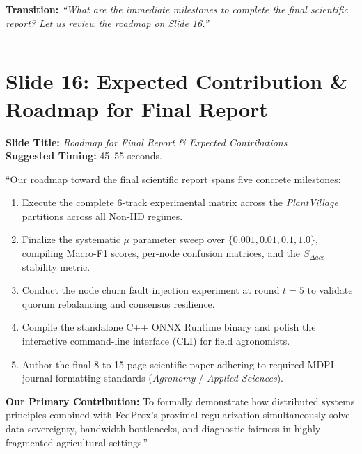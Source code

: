 \documentclass[11pt,a4paper]{article}
\begin{document}
\textbf{Transition:} \textit{``What are the immediate milestones to complete the final scientific report? Let us review the roadmap on Slide 16.''}

\vspace{0.35cm}\hrule\vspace{0.35cm}

\section{Slide 16: Expected Contribution \& Roadmap for Final Report}
\textbf{Slide Title:} \textit{Roadmap for Final Report \& Expected Contributions} \\
\textbf{Suggested Timing:} 45--55 seconds.

\begin{tcolorbox}[colframe=darkgreen, title=\textbf{What to Say in the Presentation (Literal Script)}]
``Our roadmap toward the final scientific report spans five concrete milestones:
\begin{enumerate}
    \item Execute the complete 6-track experimental matrix across the \textit{PlantVillage} partitions across all Non-IID regimes.
    \item Finalize the systematic $\mu$ parameter sweep over $\{0.001, 0.01, 0.1, 1.0\}$, compiling Macro-F1 scores, per-node confusion matrices, and the $S_{\Delta acc}$ stability metric.
    \item Conduct the node churn fault injection experiment at round $t=5$ to validate quorum rebalancing and consensus resilience.
    \item Compile the standalone C++ ONNX Runtime binary and polish the interactive command-line interface (CLI) for field agronomists.
    \item Author the final 8-to-15-page scientific paper adhering to required MDPI journal formatting standards (\textit{Agronomy} / \textit{Applied Sciences}).
\end{enumerate}

\textbf{Our Primary Contribution:} To formally demonstrate how distributed systems principles combined with FedProx's proximal regularization simultaneously solve data sovereignty, bandwidth bottlenecks, and diagnostic fairness in highly fragmented agricultural settings.''
\end{tcolorbox}
\end{document}
